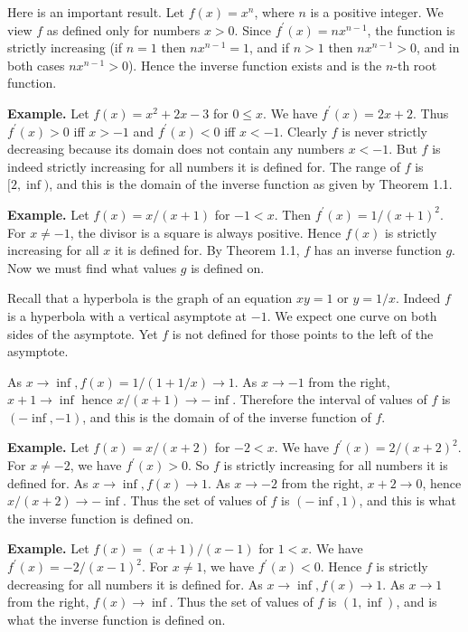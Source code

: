 Here is an important result. Let $f(x) = x^n$, where $n$ is a positive integer. We view $f$ as defined only for numbers $x > 0$. Since $f^\prime(x) = nx^{n-1}$, the function is strictly increasing (if $n = 1$ then $nx^{n-1} = 1$, and if $n > 1$ then $nx^{n-1} > 0$, and in both cases $nx^{n-1} > 0$). Hence the inverse function exists and is the $n$-th root function.

\textbf{Example.} Let $f(x) = x^2 + 2x - 3$ for $0 \le x$. We have $f^\prime(x) = 2x + 2$. Thus $f^\prime(x) > 0$ iff $x > -1$ and $f^\prime(x) < 0$ iff $x < -1$. Clearly $f$ is never strictly decreasing because its domain does not contain any numbers $x < -1$. But $f$ is indeed strictly increasing for all numbers it is defined for. The range of $f$ is $[2, \inf)$, and this is the domain of the inverse function as given by Theorem 1.1.

  \textbf{Example.} Let $f(x) = x/(x+1)$ for $-1 < x$. Then $f^\prime(x) = 1/(x+1)^2$. For $x \ne -1$, the divisor is a square is always positive. Hence $f(x)$ is strictly increasing for all $x$ it is defined for. By Theorem 1.1, $f$ has an inverse function $g$. Now we must find what values $g$ is defined on.
  
  Recall that a hyperbola is the graph of an equation $xy = 1$ or $y = 1/x$. Indeed $f$ is a hyperbola with a vertical asymptote at $-1$. We expect one curve on both sides of the asymptote. Yet $f$ is not defined for those points to the left of the asymptote.

  As $x \to \inf, f(x) = 1/(1 + 1/x) \to 1$. As $x \to -1$ from the right, $x + 1 \to \inf$ hence $x/(x + 1) \to -\inf$. Therefore the interval of values of $f$ is $(-\inf, -1)$, and this is the domain of of the inverse function of $f$.

  \textbf{Example.} Let $f(x) = x/(x + 2)$ for $-2 < x$. We have $f^\prime(x) = 2/(x + 2)^2$. For $x \ne -2$, we have $f^\prime(x) > 0$. So $f$ is strictly increasing for all numbers it is defined for. As $x \to \inf, f(x) \to 1$. As $x \to -2$ from the right, $x + 2 \to 0$, hence $x/(x + 2) \to -\inf$. Thus the set of values of $f$ is $(-\inf, 1)$, and this is what the inverse function is defined on.

  \textbf{Example.} Let $f(x) = (x + 1)/(x - 1)$ for $1 < x$. We have $f^\prime(x) = -2/(x - 1)^2$. For $x \ne 1$, we have $f^\prime(x) < 0$. Hence $f$ is strictly decreasing for all numbers it is defined for. As $x \to \inf, f(x) \to 1$. As $x \to 1$ from the right, $f(x) \to \inf$. Thus the set of values of $f$ is $(1, \inf)$, and is what the inverse function is defined on.

